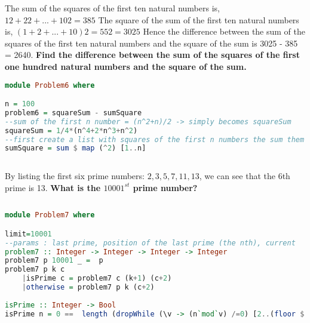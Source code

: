 \begin{problem}
The sum of the squares of the first ten natural numbers is, $12 + 22 + ... + 102 = 385$
The square of the sum of the first ten natural numbers is, $(1 + 2 + ... + 10)2 = 552 = 3025$
Hence the difference between the sum of the squares of the first ten natural numbers and the square of the sum is 3025 - 385 = 2640.
\textbf{Find the difference between the sum of the squares of the first one hundred natural numbers and the square of the sum.}
\end{problem}	

\begin{solution}

		\begin{lstlisting}[language=Haskell, caption="Haskell"]
module Problem6 where

n = 100
problem6 = squareSum - sumSquare
--sum of the first n number = (n^2+n)/2 -> simply becomes squareSum
squareSum = 1/4*(n^4+2*n^3+n^2)
--first create a list with squares of the first n numbers the sum them up
sumSquare = sum $ map (^2) [1..n]
        

		\end{lstlisting}  

\end{solution}	



\begin{problem}
By listing the first six prime numbers: $2, 3, 5, 7, 11, 13$, we can see that the 6th prime is 13.
\textbf{What is the $10001^{st}$ prime number?}
\end{problem}	

\begin{solution}

		\begin{lstlisting}[language=Haskell, caption="Haskell"]
        
module Problem7 where

limit=10001
--params : last prime, position of the last prime (the nth), current
problem7 :: Integer -> Integer -> Integer -> Integer
problem7 p 10001 _ =  p
problem7 p k c     
    |isPrime c = problem7 c (k+1) (c+2)
    |otherwise = problem7 p k (c+2)
                 
isPrime :: Integer -> Bool
isPrime n = 0 ==  length (dropWhile (\v -> (n`mod`v) /=0) [2..(floor $ sqrt(fromInteger n))])


		\end{lstlisting}  

\end{solution}	


